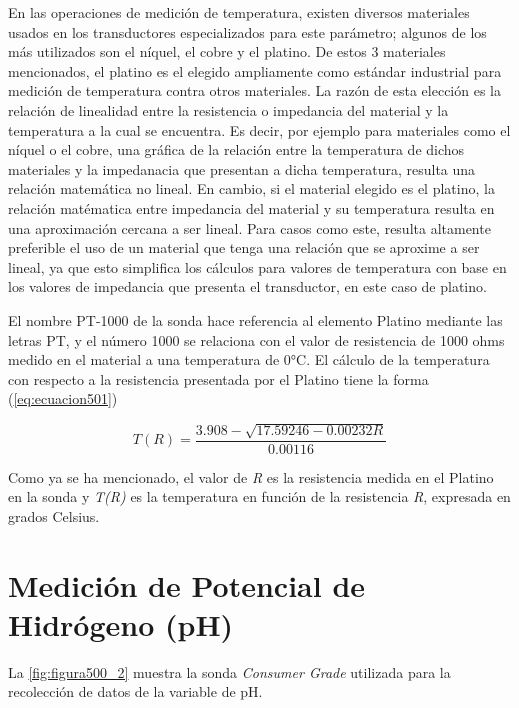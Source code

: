 En las operaciones de medición de temperatura, existen diversos materiales usados en los transductores especializados para este parámetro; algunos de los más utilizados son el níquel, el cobre y el platino. De estos 3 materiales
mencionados, el platino es el elegido ampliamente como estándar industrial para medición de temperatura contra otros materiales. La razón de esta elección es la relación de linealidad entre la resistencia o impedancia del 
material y la temperatura a la cual se encuentra. Es decir, por ejemplo para materiales como el níquel o el cobre, una gráfica de la relación entre la temperatura de dichos materiales y la impedanacia que presentan a dicha 
temperatura, resulta una relación matemática no lineal. En cambio, si el material elegido es el platino, la relación matématica entre impedancia del material y su temperatura resulta en una aproximación cercana a ser lineal. Para 
casos como este, resulta altamente preferible el uso de un material que tenga una relación que se aproxime a ser lineal, ya que esto simplifica los cálculos para valores de temperatura con base en los valores de impedancia que presenta
el transductor, en este caso de platino.

El nombre PT-1000 de la sonda hace referencia al elemento Platino mediante las letras PT, y el número 1000 se relaciona con el valor de resistencia de 1000 ohms medido en el material a una temperatura de 0°C. El cálculo de la 
temperatura con respecto a la resistencia presentada por el Platino tiene la forma (\ref{eq:ecuacion501})

\begin{equation}
	T(R)=\frac{3.908-\sqrt{17.59246-0.00232R}}{0.00116}
	\label{eq:ecuacion501}
\end{equation}

Como ya se ha mencionado, el valor de \textit{R} es la resistencia medida en el Platino en la sonda y \textit{T(R)} es la temperatura en función de la resistencia \textit{R}, expresada en grados Celsius.

\section{Medición de Potencial de Hidrógeno (pH)}

La \autoref{fig:figura500_2} muestra la sonda \textit{Consumer Grade} utilizada para la recolección de datos de la variable de pH.

